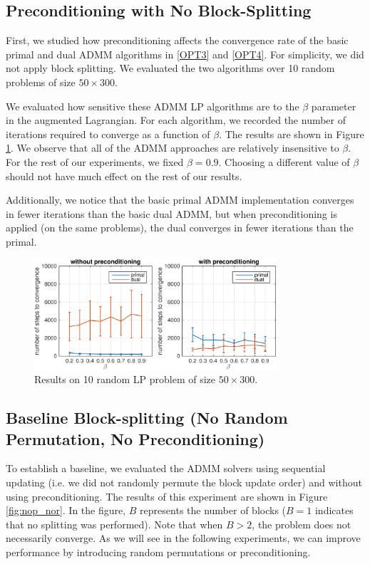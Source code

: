 \documentclass{article}
\begin{document}
{\subsection*{Preconditioning with No Block-Splitting}

First, we studied how preconditioning affects the convergence rate of the basic primal and dual ADMM algorithms in \eqref{OPT3} and \eqref{OPT4}. For simplicity, we did not apply block splitting. We evaluated the two algorithms over 10 random problems of size $50 \times 300$. 

We evaluated how sensitive these ADMM LP algorithms are to the $\beta$ parameter in the augmented Lagrangian. For each algorithm, we recorded the number of iterations required to converge as a function of $\beta$. The results  are shown in Figure \ref{fig:base_p_d}. We observe that all of the ADMM approaches are relatively insensitive to $\beta$. For the rest of our experiments, we fixed $\beta=0.9$. Choosing a different value of $\beta$ should not have much effect on the rest of our results. 

Additionally, we notice that the basic primal ADMM implementation converges in fewer iterations than the basic dual ADMM, but when preconditioning is applied (on the same problems), the dual converges in fewer iterations than the primal.
\newline
\newline
\newline
\begin{figure}[ht]
	\centering
	\includegraphics[width=0.8\textwidth]{../figures/primal_dual_preconditioning.png}
	\caption{Results on 10 random LP problem of size $50 \times 300$. }
	\label{fig:base_p_d}
\end{figure}
\newpage
\subsection*{Baseline Block-splitting (No Random Permutation, No Preconditioning)}
To establish a baseline, we evaluated the ADMM solvers using sequential updating (i.e. we did not randomly permute the block update order) and without using preconditioning. The results of this experiment are shown in Figure \ref{fig:nop_nor}. In the figure, $B$ represents the number of blocks ($B=1$ indicates that no splitting was performed). Note that when $B>2$, the problem does not necessarily converge. As we will see in the following experiments, we can improve performance by introducing random permutations or preconditioning.
\newline
\newline
\newline
\newline

}
\end{document}
